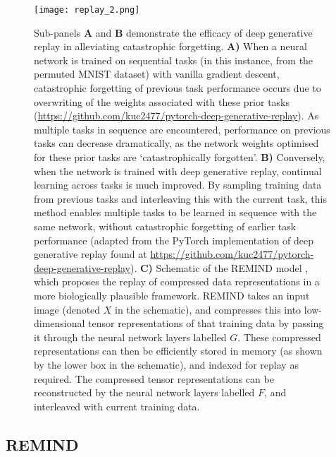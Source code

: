 \documentclass{article} %
\begin{document}
\begin{figure}[ht]
\texttt{[image: replay\_2.png]}
\caption{Sub-panels \textbf{A} and \textbf{B} demonstrate the efficacy of deep generative replay in alleviating catastrophic forgetting. \textbf{A)} When a neural network is trained on sequential tasks (in this instance, from the permuted MNIST dataset) with vanilla gradient descent, catastrophic forgetting of previous task performance occurs due to overwriting of the weights associated with these prior tasks (\url{https://github.com/kuc2477/pytorch-deep-generative-replay}). As multiple tasks in sequence are encountered, performance on previous tasks can decrease dramatically, as the network weights optimised for these prior tasks are ‘catastrophically forgotten’. \textbf{B)} Conversely, when the network is trained with deep generative replay, continual learning across tasks is much improved. By sampling training data from previous tasks and interleaving this with the current task, this method enables multiple tasks to be learned in sequence with the same network, without catastrophic forgetting of earlier task performance (adapted from the PyTorch implementation of deep generative replay found at \url{https://github.com/kuc2477/pytorch-deep-generative-replay}). \textbf{C)} Schematic of the REMIND model \citep{hayes2020remind}, which proposes the replay of compressed data representations in a more biologically plausible framework. REMIND takes an input image (denoted $X$ in the schematic), and compresses this into low-dimensional tensor representations of that training data by passing it through the neural network layers labelled $G$. These compressed representations can then be efficiently stored in memory (as shown by the lower box in the schematic), and indexed for replay as required. The compressed tensor representations can be reconstructed by the neural network layers labelled $F$, and interleaved with current training data.}
\end{figure}

\subsection*{REMIND}
\end{document}
